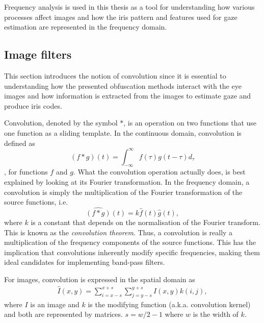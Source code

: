 Frequency analysis is used in this thesis as a tool for understanding how various processes affect images and how the iris pattern and features used for gaze estimation are represented in the frequency domain.

\subsection{Image filters}
This section introduces the notion of convolution since it is essential to understanding how the presented obfuscation methods interact with the eye images and how information is extracted from the images to estimate gaze and produce iris codes.

Convolution, denoted by the symbol $*$, is an operation on two functions that use one function as a sliding template. In the continuous domain, convolution is defined as
\begin{equation}
    (f*g)(t) = \int_{-\infty}^\infty f(\tau)g(t-\tau)d_\tau
\end{equation},
for functions $f$ and $g$. 
What the convolution operation actually does, is best explained by looking at its Fourier transformation. In the frequency domain, a convolution is simply the multiplication of the Fourier transformation of the source functions, i.e.
\begin{equation}
    \widehat{(f*g)}(t) = k\hat{f}(t)\hat{g}(t),
\end{equation}
where $k$ is a constant that depends on the normalisation of the Fourier transform. This is known as the \emph{convolution theorem}. Thus, a convolution is really a multiplication of the frequency components of the source functions. This has the implication that convolutions inherently modify specific frequencies, making them ideal candidates for implementing band-pass filters. 

For images, convolution is expressed in the spatial domain as
\begin{align}
    \hat{I}(x, y) = \sum_{i=x-s}^{x+s}\sum_{j=y-s}^{y+s} I(x,y)k(i,j),
\end{align}
where $I$ is an image and $k$ is the modifying function (a.k.a. convolution kernel) and both are represented by matrices. $s=w/2 -1$ where $w$ is the width of $k$.




